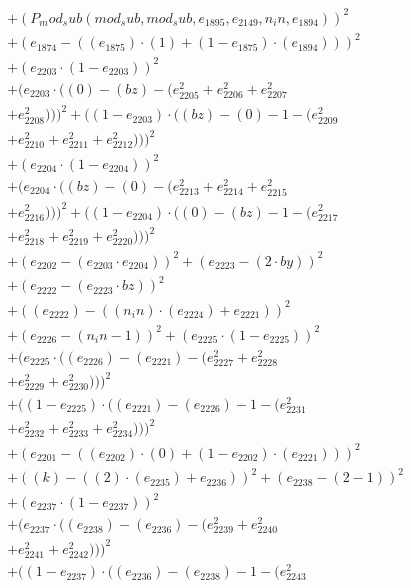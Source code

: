 \documentclass[10pt, a4paper]{article}
\begin{document}
\begin{small}
\begin{align*}
& + (P_mod_sub(mod_sub, mod_sub, e_{1895}, e_{2149}, n_in, e_{1894}))^{2} \\
& + (e_{1874} - ((e_{1875})  \cdot  (1) + (1 - e_{1875})  \cdot  (e_{1894})))^{2} \\
& + (e_{2203}  \cdot  (1 - e_{2203}))^{2} \\
& + (e_{2203}  \cdot  ((0) - (bz) - (e_{2205}^{2} + e_{2206}^{2} + e_{2207}^{2} \\
& + e_{2208}^{2})))^{2} + ((1 - e_{2203})  \cdot  ((bz) - (0) - 1 - (e_{2209}^{2} \\
& + e_{2210}^{2} + e_{2211}^{2} + e_{2212}^{2})))^{2} \\
& + (e_{2204}  \cdot  (1 - e_{2204}))^{2} \\
& + (e_{2204}  \cdot  ((bz) - (0) - (e_{2213}^{2} + e_{2214}^{2} + e_{2215}^{2} \\
& + e_{2216}^{2})))^{2} + ((1 - e_{2204})  \cdot  ((0) - (bz) - 1 - (e_{2217}^{2} \\
& + e_{2218}^{2} + e_{2219}^{2} + e_{2220}^{2})))^{2} \\
& + (e_{2202} - (e_{2203}  \cdot  e_{2204}))^{2} + (e_{2223} - (2  \cdot  by))^{2} \\
& + (e_{2222} - (e_{2223}  \cdot  bz))^{2} \\
& + ((e_{2222}) - ((n_in)  \cdot  (e_{2224}) + e_{2221}))^{2} \\
& + (e_{2226} - (n_in - 1))^{2} + (e_{2225}  \cdot  (1 - e_{2225}))^{2} \\
& + (e_{2225}  \cdot  ((e_{2226}) - (e_{2221}) - (e_{2227}^{2} + e_{2228}^{2} \\
& + e_{2229}^{2} + e_{2230}^{2})))^{2} \\
& + ((1 - e_{2225})  \cdot  ((e_{2221}) - (e_{2226}) - 1 - (e_{2231}^{2} \\
& + e_{2232}^{2} + e_{2233}^{2} + e_{2234}^{2})))^{2} \\
& + (e_{2201} - ((e_{2202})  \cdot  (0) + (1 - e_{2202})  \cdot  (e_{2221})))^{2} \\
& + ((k) - ((2)  \cdot  (e_{2235}) + e_{2236}))^{2} + (e_{2238} - (2 - 1))^{2} \\
& + (e_{2237}  \cdot  (1 - e_{2237}))^{2} \\
& + (e_{2237}  \cdot  ((e_{2238}) - (e_{2236}) - (e_{2239}^{2} + e_{2240}^{2} \\
& + e_{2241}^{2} + e_{2242}^{2})))^{2} \\
& + ((1 - e_{2237})  \cdot  ((e_{2236}) - (e_{2238}) - 1 - (e_{2243}^{2} \\

\end{align*}
\end{small}
\end{document}
